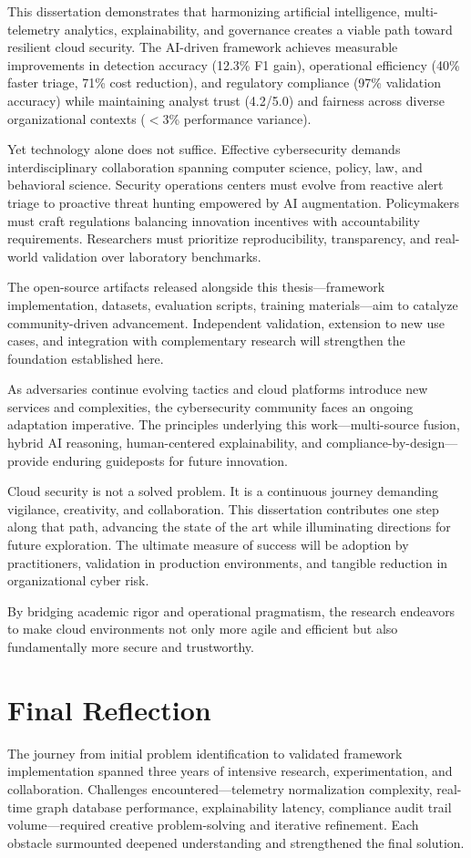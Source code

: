 This dissertation demonstrates that harmonizing artificial intelligence, multi-telemetry analytics, explainability, and governance creates a viable path toward resilient cloud security. The AI-driven framework achieves measurable improvements in detection accuracy (12.3\% F1 gain), operational efficiency (40\% faster triage, 71\% cost reduction), and regulatory compliance (97\% validation accuracy) while maintaining analyst trust (4.2/5.0) and fairness across diverse organizational contexts ($<$3\% performance variance).

Yet technology alone does not suffice. Effective cybersecurity demands interdisciplinary collaboration spanning computer science, policy, law, and behavioral science. Security operations centers must evolve from reactive alert triage to proactive threat hunting empowered by AI augmentation. Policymakers must craft regulations balancing innovation incentives with accountability requirements. Researchers must prioritize reproducibility, transparency, and real-world validation over laboratory benchmarks.

The open-source artifacts released alongside this thesis—framework implementation, datasets, evaluation scripts, training materials—aim to catalyze community-driven advancement. Independent validation, extension to new use cases, and integration with complementary research will strengthen the foundation established here.

As adversaries continue evolving tactics and cloud platforms introduce new services and complexities, the cybersecurity community faces an ongoing adaptation imperative. The principles underlying this work—multi-source fusion, hybrid AI reasoning, human-centered explainability, and compliance-by-design—provide enduring guideposts for future innovation.

Cloud security is not a solved problem. It is a continuous journey demanding vigilance, creativity, and collaboration. This dissertation contributes one step along that path, advancing the state of the art while illuminating directions for future exploration. The ultimate measure of success will be adoption by practitioners, validation in production environments, and tangible reduction in organizational cyber risk.

By bridging academic rigor and operational pragmatism, the research endeavors to make cloud environments not only more agile and efficient but also fundamentally more secure and trustworthy.

\section*{Final Reflection}
The journey from initial problem identification to validated framework implementation spanned three years of intensive research, experimentation, and collaboration. Challenges encountered—telemetry normalization complexity, real-time graph database performance, explainability latency, compliance audit trail volume—required creative problem-solving and iterative refinement. Each obstacle surmounted deepened understanding and strengthened the final solution.

